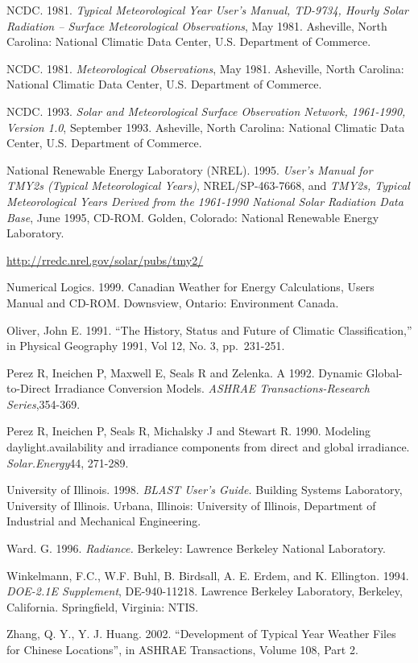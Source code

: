 NCDC. 1981. \emph{Typical Meteorological Year User's Manual, TD-9734, Hourly Solar Radiation -- Surface Meteorological Observations}, May 1981. Asheville, North Carolina: National Climatic Data Center, U.S. Department of Commerce.

NCDC. 1981. \emph{Meteorological Observations}, May 1981. Asheville, North Carolina: National Climatic Data Center, U.S. Department of Commerce.

NCDC. 1993. \emph{Solar and Meteorological Surface Observation Network, 1961-1990, Version 1.0}, September 1993. Asheville, North Carolina: National Climatic Data Center, U.S. Department of Commerce.

National Renewable Energy Laboratory (NREL). 1995. \emph{User's Manual for TMY2s (Typical Meteorological Years)}, NREL/SP-463-7668, and \emph{TMY2s, Typical Meteorological Years Derived from the 1961-1990 National Solar Radiation Data Base}, June 1995, CD-ROM. Golden, Colorado: National Renewable Energy Laboratory.

\url{http://rredc.nrel.gov/solar/pubs/tmy2/}

Numerical Logics. 1999. Canadian Weather for Energy Calculations, Users Manual and CD-ROM. Downsview, Ontario: Environment Canada.

Oliver, John E. 1991. ``The History, Status and Future of Climatic Classification,'' in Physical Geography 1991, Vol 12, No. 3, pp.~231-251.

Perez R, Ineichen P, Maxwell E, Seals R and Zelenka. A 1992. Dynamic Global-to-Direct Irradiance Conversion Models. \emph{ASHRAE Transactions-Research Series},354-369.

Perez R, Ineichen P, Seals R, Michalsky J and Stewart R. 1990. Modeling daylight.availability and irradiance components from direct and global irradiance. \emph{Solar.Energy}44, 271-289.

University of Illinois. 1998. \emph{BLAST User's Guide.} Building Systems Laboratory, University of Illinois. Urbana, Illinois: University of Illinois, Department of Industrial and Mechanical Engineering.

Ward. G. 1996. \emph{Radiance.} Berkeley: Lawrence Berkeley National Laboratory.

Winkelmann, F.C., W.F. Buhl, B. Birdsall, A. E. Erdem, and K. Ellington. 1994. \emph{DOE-2.1E Supplement}, DE-940-11218. Lawrence Berkeley Laboratory, Berkeley, California. Springfield, Virginia: NTIS.

Zhang, Q. Y., Y. J. Huang. 2002. ``Development of Typical Year Weather Files for Chinese Locations'', in ASHRAE Transactions, Volume 108, Part 2.
